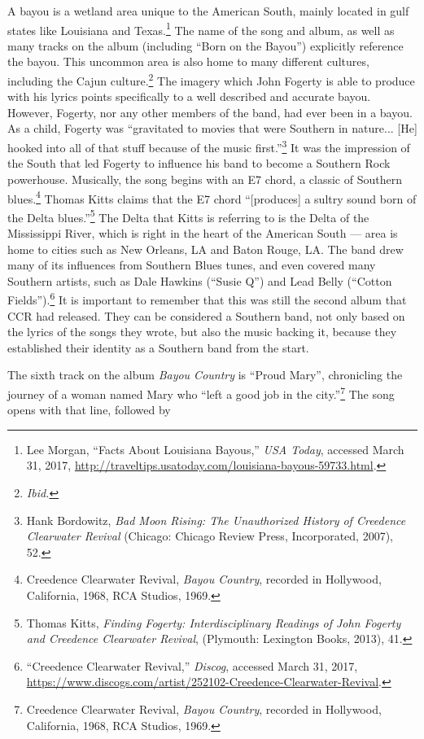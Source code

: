 \documentclass[10pt]{article}
\begin{document}
\doublespacing
\noindent A bayou is a wetland area unique to the American South, mainly located in gulf states like Louisiana and Texas.\footnote{Lee Morgan, ``Facts About Louisiana Bayous,'' \textit{USA Today}, accessed March 31, 2017, \url{http://traveltips.usatoday.com/louisiana-bayous-59733.html}.}  The name of the song and album, as well as many tracks on the album (including ``Born on the Bayou'') explicitly reference the bayou. This uncommon area is also home to many different cultures, including the Cajun culture.\footnote{\textit{Ibid.}} The imagery which John Fogerty is able to produce with his lyrics points specifically to a well described and accurate bayou. However, Fogerty, nor any other members of the band, had ever been in a bayou. As a child, Fogerty was ``gravitated to movies that were Southern in nature... [He] hooked into all of that stuff because of the music first.''\footnote{Hank Bordowitz, \textit{Bad Moon Rising: The Unauthorized History of Creedence Clearwater Revival} (Chicago: Chicago Review Press, Incorporated, 2007), 52.} It was the impression of the South that led Fogerty to influence his band to become a Southern Rock powerhouse. Musically, the song begins with an E7 chord, a classic of Southern blues.\footnote{Creedence Clearwater Revival, \textit{Bayou Country}, recorded in Hollywood, California, 1968, RCA Studios, 1969.} Thomas Kitts claims that the E7 chord ``[produces] a sultry sound born of the Delta blues.''\footnote{Thomas Kitts, \textit{Finding Fogerty: Interdisciplinary Readings of John Fogerty and Creedence Clearwater Revival}, (Plymouth: Lexington Books, 2013), 41.} The Delta that Kitts is referring to is the Delta of the Mississippi River, which is right in the heart of the American South --- area is home to cities such as New Orleans, LA and Baton Rouge, LA. The band drew many of its influences from Southern Blues tunes, and even covered many Southern artists, such as Dale Hawkins (``Susie Q'') and Lead Belly (``Cotton Fields'').\footnote{``Creedence Clearwater Revival,'' \textit{Discog}, accessed March 31, 2017, \url{https://www.discogs.com/artist/252102-Creedence-Clearwater-Revival}.} It is important to remember that this was still the second album that CCR had released. They can be considered a Southern band, not only based on the lyrics of the songs they wrote, but also the music backing it, because they established their identity as a Southern band from the start.

The sixth track on the album \textit{Bayou Country} is ``Proud Mary'', chronicling the journey of a woman named Mary who ``left a good job in the city.''\footnote{Creedence Clearwater Revival, \textit{Bayou Country}, recorded in Hollywood, California, 1968, RCA Studios, 1969.} The song opens with that line, followed by
\end{document}
